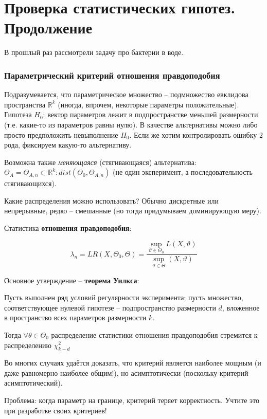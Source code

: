 \documentclass[main.tex]{subfiles}
\begin{document}
	
	\section{Проверка статистических гипотез. Продолжение}
	В прошлый раз рассмотрели задачу про бактерии в воде.
	\subsubsection{Параметрический критерий отношения правдоподобия}
	
Подразумевается, что параметрическое множество -- подмножество евклидова пространства $ \mathds R ^k $ (иногда, впрочем, некоторые параметры положительные).
Гипотеза $ H_0 $: вектор параметров лежит в подпространстве меньшей размерности (т.е. какие-то из параметров равны нулю).
В качестве альтернативы можно либо просто предположить невыполнение $ H_0 $.
Если же хотим контролировать ошибку $ 2 $ рода, фиксируем какую-то альтернативу.

Возможна также \emph{меняющаяся} (стягивающаяся) альтернатива: $ \Theta_A = \Theta_{A,n} \subset \mathds R^k : dist(\Theta_0, \Theta_{A,n}) $ (не один эксперимент, а последовательность стягивающихся).

Какие распределения можно использовать?
Обычно дискретные или непрерывные, редко -- смешанные (но тогда придумываем доминирующую меру).

Статистика \textbf{отношения правдоподобия}:

\[ \lambda_n = LR(X, \Theta_0, \Theta) = \frac{\sup_{\vartheta \in \Theta_0}L(X,\vartheta)}{\sup_{\vartheta \in \Theta} (X, \vartheta)} \]

Основное утверждение -- \textbf{теорема Уилкса}:

\begin{leftbar} %
Пусть выполнен ряд условий регулярности эксперимента; пусть множество, соответствующее нулевой гипотезе -- подпространство размерности $ d $, вложенное в пространство всех параметров  размерности $ k $.

Тогда $ \forall \theta \in \Theta_0 $ распределение статистики отношения правдоподобия стремится к распределению $ \chi^2_{k-d} $
\end{leftbar}

Во многих случаях удаётся доказать, что критерий является наиболее мощным (и даже равномерно наиболее общим!), но асимптотически (поскольку критерий асимптотический).

Проблема: когда параметр на границе, критерий теряет корректность.
Учтите это при разработке своих критериев!
\end{document}
